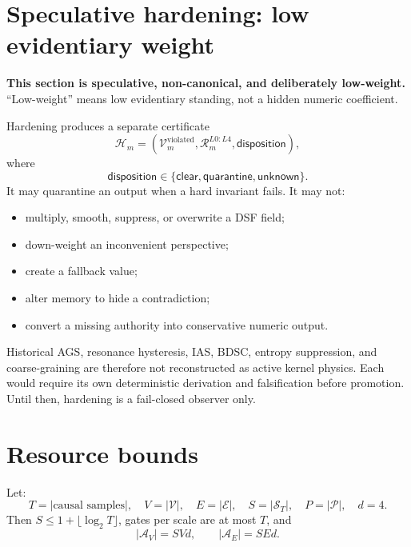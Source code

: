 \documentclass[11pt,oneside]{article}
\newcommand{\Vertices}{\mathcal{V}}
\newcommand{\Edges}{\mathcal{E}}
\newcommand{\Scales}{\mathcal{S}}
\newcommand{\Perspectives}{\mathcal{P}}
\newcommand{\Atoms}{\mathcal{A}}
\begin{document}
\section{Speculative hardening: low evidentiary weight}

\textcolor{warningred}{\bfseries This section is speculative, non-canonical,
and deliberately low-weight.} ``Low-weight'' means low evidentiary standing,
not a hidden numeric coefficient.

Hardening produces a separate certificate
\[
  \mathcal{H}_m=
  \left(
    \mathcal{V}^{\mathrm{violated}}_m,
    \mathcal{R}^{L0:L4}_m,
    \mathsf{disposition}
  \right),
\]
where
\[
  \mathsf{disposition}\in
  \{\mathsf{clear},\mathsf{quarantine},\mathsf{unknown}\}.
\]
It may quarantine an output when a hard invariant fails. It may not:
\begin{itemize}
  \item multiply, smooth, suppress, or overwrite a DSF field;
  \item down-weight an inconvenient perspective;
  \item create a fallback value;
  \item alter memory to hide a contradiction;
  \item convert a missing authority into conservative numeric output.
\end{itemize}

Historical AGS, resonance hysteresis, IAS, BDSC, entropy suppression, and
coarse-graining are therefore not reconstructed as active kernel physics.
Each would require its own deterministic derivation and falsification before
promotion. Until then, hardening is a fail-closed observer only.

\section{Resource bounds}

Let:
\[
  T=|\text{causal samples}|,\quad
  V=|\Vertices|,\quad E=|\Edges|,\quad
  S=|\Scales_T|,\quad P=|\Perspectives|,\quad d=4.
\]
Then \(S\leq1+\lfloor\log_2T\rfloor\), gates per scale are at most \(T\), and
\[
  |\Atoms_V|=SVd,\qquad |\Atoms_E|=SEd.
\]
\end{document}
